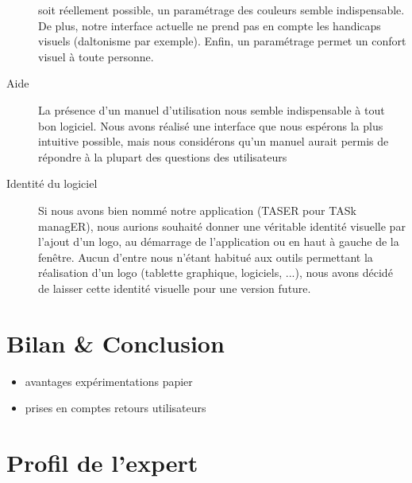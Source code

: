 \documentclass[11pt]{article}
\begin{document}
\begin{description}
  soit réellement possible, un paramétrage des couleurs semble
  indispensable. De plus, notre interface actuelle ne prend pas en
  compte les handicaps visuels (daltonisme par exemple). Enfin, un
  paramétrage permet un confort visuel à toute personne.
\item[Aide] La présence d'un manuel d'utilisation nous semble
  indispensable à tout bon logiciel. Nous avons réalisé une interface
  que nous espérons la plus intuitive possible, mais nous considérons
  qu'un manuel aurait permis de répondre à la plupart des questions
  des utilisateurs
\item[Identité du logiciel] Si nous avons bien nommé notre application
  (TASER pour TASk managER), nous aurions souhaité donner une
  véritable identité visuelle par l'ajout d'un logo, au démarrage de
  l'application ou en haut à gauche de la fenêtre. Aucun d'entre nous
  n'étant habitué aux outils permettant la réalisation d'un logo
  (tablette graphique, logiciels, ...), nous avons décidé de laisser
  cette identité visuelle pour une version future.
\end{description}




\section{Bilan \& Conclusion}
\begin{itemize}
\item avantages expérimentations papier
\item prises en comptes retours utilisateurs
\end{itemize}

\printglossaries

\appendix

\section{Profil de l'expert}
\label{sec:profilExpert}
\end{document}
